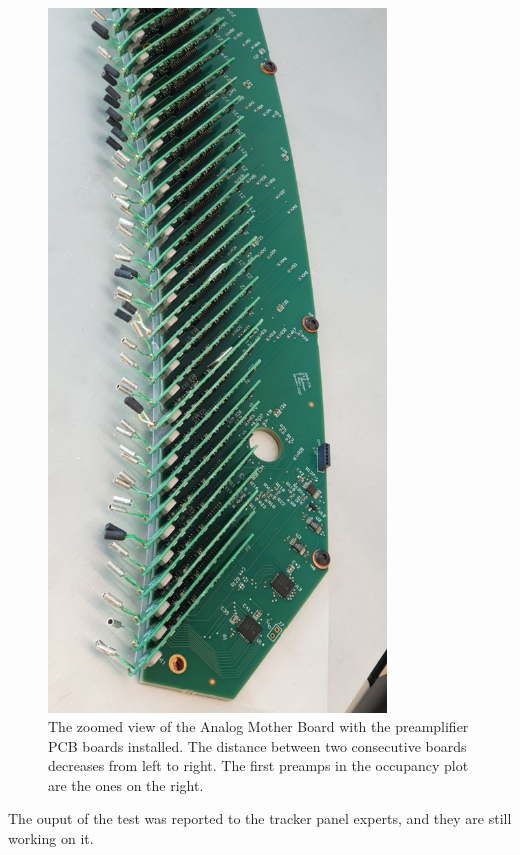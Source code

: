 \begin{figure}[!h]
  \centering
  \includegraphics[angle=90,width=0.8\textwidth]{figures/jpg/photo_6028424923279639562_y.jpg}
  \caption[The zoomed view of the Analog Mother Board with the 
  preamplifier boards installed.]{The zoomed view of the Analog Mother Board with the 
  preamplifier PCB boards installed. The distance between 
  two consecutive boards decreases from left to right. 
  The first preamps in the occupancy plot are the ones on the right.}
 \label{fig:spacepreamps}
\end{figure}
The ouput of the test was reported to the tracker panel 
experts, and they are still working on it.

